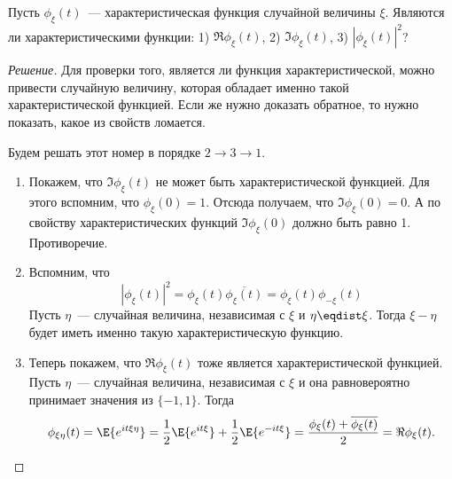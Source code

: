 \begin{problem}
	Пусть \(\phi_{\xi}(t)\)~--- характеристическая функция случайной величины 
	\(\xi\). Являются ли характеристическими функции: 1) \(\Re \phi_{\xi}(t)\), 
	2) \(\Im\phi_{\xi}(t)\), 3) \(|\phi_{\xi}(t)|^2\)?
\end{problem}
\begin{proof}[Решение]
	Для проверки того, является ли функция характеристической, можно привести 
	случайную величину, которая обладает именно такой характеристической 
	функцией. Если же нужно доказать обратное, то нужно показать, какое из 
	свойств ломается.
	
	Будем решать этот номер в порядке \(2 \to 3 \to 1\).
	\begin{enumerate}
		\item Покажем, что \(\Im\phi_{\xi}(t)\) не может быть 
		характеристической функцией. Для этого вспомним, что \(\phi_{\xi}(0) = 
		1\). Отсюда получаем, что \(\Im\phi_{\xi}(0) = 0\). А по свойству 
		характеристических функций \(\Im\phi_{\xi}(0)\) должно быть равно 1. 
		Противоречие.
		\item Вспомним, что
		\[
		|\phi_{\xi}(t)|^2 = \phi_{\xi}(t)\overline{\phi_{\xi}(t)} = 
		\phi_{\xi}(t)\phi_{-\xi}(t)
		\]
		Пусть \(\eta\)~--- случайная величина, независимая с \(\xi\) и \(\eta 
		\eqdist \xi\). Тогда \(\xi - \eta\) будет иметь именно такую 
		характеристическую функцию.
		\item Теперь покажем, что \(\Re \phi_{\xi}(t)\) тоже является 
		характеристической функцией. Пусть \(\eta\)~--- случайная величина, 
		независимая с \(\xi\) и она равновероятно принимает значения из \(\{-1, 
		1\}\). Тогда
		\[
		\phi_{\xi\eta}(t) = \E{e^{it\xi\eta}} = \frac{1}{2}\E{e^{it\xi}} + 
		\frac{1}{2}\E{e^{-it\xi}} = \frac{\phi_{\xi}(t) + 
		\overline{\phi_{\xi}(t)}}{2} = \Re \phi_{\xi}(t).\qedhere
		\]
	\end{enumerate}
\end{proof}

